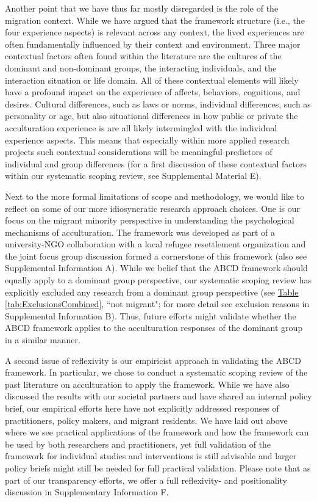 \documentclass[man, 12pt, a4paper, mask]{apa7}
\newcommand{\tblref}[2][]{\hyperref[#2]{Table \ref*{#2}#1}}
\begin{document}
Another point that we have thus far mostly disregarded is the role of the migration context. While we have argued that the framework structure (i.e., the four experience aspects) is relevant across any context, the lived experiences are often fundamentally influenced by their context and environment. Three major contextual factors often found within the literature are the cultures of the dominant and non-dominant groups, the interacting individuals, and the interaction situation or life domain. All of these contextual elements will likely have a profound impact on the experience of affects, behaviors, cognitions, and desires. Cultural differences, such as laws or norms, individual differences, such as personality or age, but also situational differences in how public or private the acculturation experience is are all likely intermingled with the individual experience aspects. This means that especially within more applied research projects such contextual considerations will be meaningful predictors of individual and group differences (for a first discussion of these contextual factors within our systematic scoping review, see Supplemental Material E). 

Next to the more formal limitations of scope and methodology, we would like to reflect on some of our more idiosyncratic research approach choices. One is our focus on the migrant minority perspective in understanding the psychological mechanisms of acculturation. The framework was developed as part of a university-NGO collaboration with a local refugee resettlement organization and the joint focus group discussion formed a cornerstone of this framework (also see Supplemental Information A). While we belief that the ABCD framework should equally apply to a dominant group perspective, our systematic scoping review has explicitly excluded any research from a dominant group perspective (see \tblref{tab:ExclusionsCombined}, ``not migrant"; for more detail see exclusion reasons in Supplemental Information B). Thus, future efforts might validate whether the ABCD framework applies to the acculturation responses of the dominant group in a similar manner.

A second issue of reflexivity is our empiricist approach in validating the ABCD framework. In particular, we chose to conduct a systematic scoping review of the past literature on acculturation to apply the framework. While we have also discussed the results with our societal partners and have shared an internal policy brief, our empirical efforts here have not explicitly addressed responses of practitioners, policy makers, and migrant residents. We have laid out above where we see practical applications of the framework and how the framework can be used by both researchers and practitioners, yet full validation of the framework for individual studies and interventions is still advisable and larger policy briefs might still be needed for full practical validation. Please note that as part of our transparency efforts, we offer a full reflexivity- and positionality discussion in Supplementary Information F.
\end{document}

